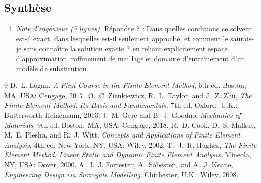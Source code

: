 \documentclass[10pt,journal]{IEEEtran}
\begin{document}
\subsection{Synthèse}
\begin{enumerate}[leftmargin=1.4em]
\item \emph{Note d'ingénieur (5 lignes).} Répondre à : \og Dans quelles conditions ce solveur est-il exact, dans lesquelles est-il seulement approché, et comment le saurais-je sans connaître la solution exacte ?\fg{} en reliant explicitement espace d'approximation, raffinement de maillage et domaine d'entraînement d'un modèle de substitution.
\end{enumerate}

\begin{thebibliography}{9}
 D.~L. Logan, \emph{A First Course in the Finite Element Method}, 6th ed. Boston, MA, USA: Cengage, 2017.
 O.~C. Zienkiewicz, R.~L. Taylor, and J.~Z. Zhu, \emph{The Finite Element Method: Its Basis and Fundamentals}, 7th ed. Oxford, U.K.: Butterworth-Heinemann, 2013.
 J.~M. Gere and B.~J. Goodno, \emph{Mechanics of Materials}, 9th ed. Boston, MA, USA: Cengage, 2018.
 R.~D. Cook, D.~S. Malkus, M.~E. Plesha, and R.~J. Witt, \emph{Concepts and Applications of Finite Element Analysis}, 4th ed. New York, NY, USA: Wiley, 2002.
 T.~J.~R. Hughes, \emph{The Finite Element Method: Linear Static and Dynamic Finite Element Analysis}. Mineola, NY, USA: Dover, 2000.
 A.~I.~J. Forrester, A.~Sóbester, and A.~J. Keane, \emph{Engineering Design via Surrogate Modelling}. Chichester, U.K.: Wiley, 2008.
\end{thebibliography}
\end{document}
